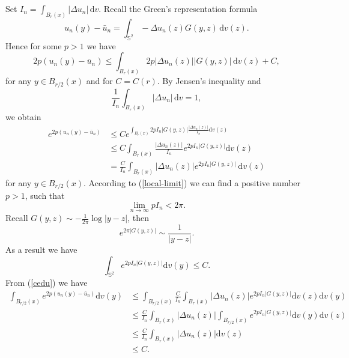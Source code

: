\documentclass[a4paper, 12pt]{article}
\begin{document}
Set \( I_n = \int_{B_r(x)} |\Delta u_n| \, {\text{d}{v}} \). Recall the Green's representation formula
\begin{equation*}
	u_n(y) - \bar u_n = \int_{\mathbb{S}^2} -\Delta u_n(z) G(y, z) \, {\text{d}{v}}(z).
\end{equation*}
Hence for some $p>1$ we have
\begin{equation*}
	2p (u_n(y) - \bar u_n) \leq \int_{B_r(x)} 2p |\Delta u_n(z)| |G(y, z)| \, {\text{d}{v}}(z) + C,
\end{equation*}
for any \( y \in B_{r/2}(x) \) and for $C=C(r)$.  By Jensen's inequality and
\begin{equation*}
	\frac{1}{I_n} \int_{B_r(x)} |\Delta u_n| \, {\text{d}{v}} = 1,
\end{equation*}
we obtain
\begin{equation}\label{cedu}			
	\begin{aligned}
		{e^{2p({u_n}(y) - {{\bar u}_n})}} &\leq C{e^{\int_{{B_r}(x)} 2 p{I_n}|G(y,z)| \frac{{|\Delta {u_n}(z)|}}{{{I_n}}}{\text{d}{v}}(z)}}\\
		&\leq  C\int_{{B_r}(x)}\frac{{|\Delta {u_n}(z)|}}{{{I_n}}} e^{2p{I_n}|G(y,z)|} {\text{d}{v}}(z)  \\
		&= \frac{C}{I_n} \int_{B_r(x)} |\Delta u_n(z)| e^{2p I_n |G(y, z)|} \, {\text{d}{v}}(z)
	\end{aligned}
\end{equation}
for any \( y \in B_{r/2}(x) \). According to (\ref{local-limit}) we can find a positive number \( p > 1 \), such that
\begin{equation*}
	\lim_{n \to \infty} p I_n < 2\pi.
\end{equation*}
Recall $ G(y, z) \sim -\frac{1}{2\pi}\log |y - z|$, then
\begin{equation*}
	e^{2\pi |G(y,z)|} \sim \frac{1}{|y - z|}.
\end{equation*}
As a result we have
\begin{equation*}
	\int_{{\mathbb{S}^2}} {{e^{2p{I_n}|G(y,z)|}}}  {\text{d}{v}}(y) \leq C.%
\end{equation*}
From (\ref{cedu}) we have
\begin{equation*}
	\begin{aligned}
		\int_{{B_{r/2}}(x)} {{e^{2p({u_n}(y) - {{\bar u}_n})}}}  {\text{d}{v}}(y) &\leq \int_{{B_{r/2}}(x)} {\frac{C}{{{I_n}}}\int_{{B_r}(x)} | \Delta {u_n}(z)|{e^{2p{I_n}|G(y,z)|}} {\text{d}{v}}(z)}  {\text{d}{v}}(y)  \\
		&\leq \frac{C}{{{I_n}}}\int_{{B_r}(x)} {\left| {\Delta {u_n}(z)} \right|\int_{{B_{r/2}}(x)}   {e^{2p{I_n}|G(y,z)|}}{\text{d}{v}}(y){\text{d}{v}}(z) }   \\
		&\leq \frac{C}{{{I_n}}}\int_{{B_r}(x)} {\left| {\Delta {u_n}(z)} \right|{\text{d}{v}}(z) }   \\
		&   \leq C  .
	\end{aligned}
\end{equation*}
\end{document}
